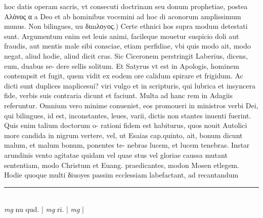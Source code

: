 \documentclass{article}
\begin{document}
\begin{pages}
hoc datis operam sacris, vt consecuti doctrinam seu donum prophetiae, postea Αλόνος α a Deo et ab hominibus vocemini ad hoc di aconorum amplissimum munus.  \pend\pstart Non bilingues, uu διmλοyος.) Certe ethnici hos supra modum detestati sunt. Argumentum enim est leuis animi, facileque mouetur suspicio doli aut fraudis, aut mentis male sibi consciae, etiam perfidiae, vbi quis modo ait, modo negat, aliud hodie, aliud dicit cras. Sic Ciceronem perstringit Laberius, dicens, eum, duabus se- dere sellis solitum. Et Satyrus vt est in Apologis, hominem contempsit et fugit, quem vidit ex eodem ore calidum spirare et frigidum. Ac dicti sunt duplices maplicesui? viri vulgo et in scripturis, qui lubrica et insyncera fide, verbis suis contraria dicunt et faciunt. Multa ad hanc rem in Adagiis referuntur. Omnium vero minime conueniet, eos promoueri in ministros verbi Dei, qui bilingues, id est, inconstantes, leues, varii, dictis non stantes inuenti fuerint. Quis enim talium doctorum o- rationi fidem est habiturus, quos nouit Autolici more candida in nigrum vertere, vel, ut Esaias cap.quinto, ait, bonum dicunt malum, et malum bonum, ponentes te- nebras lucem, et lucem tenebras. Instar arundinis vento agitatae quidam vel quae stus vel gloriae caussa mutant sententiam, modo Christum et Euang. praedicantes, modon Mosen etlegem. Hodie quoque multi δiuoyes passim ecclessiam labefactant, ad recantandum  \pend
\vspace{0.5cm}\noindent
\vspace{0.2cm}\rule{1cm}{0.2pt}\\ 
\hspace{0.2cm}\textit{mg}
\footnotesize nu qud. 
\normalsize| 
\hspace{0.2cm}\textit{mg}
\footnotesize ri. 
\normalsize| 
\hspace{0.2cm}\textit{mg}
\footnotesize 
\normalsize| 

\end{pages}
\end{document}
